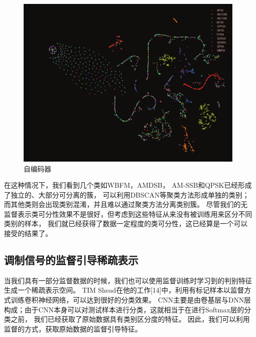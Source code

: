 \begin{figure}[!h]
	\centering
	\includegraphics[scale=0.2]{figures/chapter_3/cae_fea}
	\caption{自编码器}	\label{sec:fig_3_6}
\end{figure}

在这种情况下，我们看到几个类如WBFM，AMDSB， AM-SSB和QPSK已经形成了独立的、大部分可分离的簇，
可以利用DBSCAN等聚类方法形成单独的类别；而其他类则会出现类别混淆，并且难以通过聚类方法分离类别簇。 
尽管我们的无监督表示类可分性效果不是很好，但考虑到这些特征从来没有被训练用来区分不同类别的样本，
我们就已经获得了数据一定程度的类可分性，这已经算是一个可以接受的结果了。 \par 

\subsection{调制信号的监督引导稀疏表示}

当我们具有一部分监督数据的时候，我们也可以使用监督训练时学习到的判别特征生成一个稀疏表示空间。
TIM Shead在他的工作[14]中，利用有标记样本以监督方式训练卷积神经网络，可以达到很好的分类效果。
CNN主要是由卷基层与DNN层构成；由于CNN本身可以对测试样本进行分类，这就相当于在进行Softmax层的分类之前，
我们已经获取了原始数据具有类别区分度的特征。
因此，我们可以利用监督的方式，获取原始数据的监督引导特征。\par

